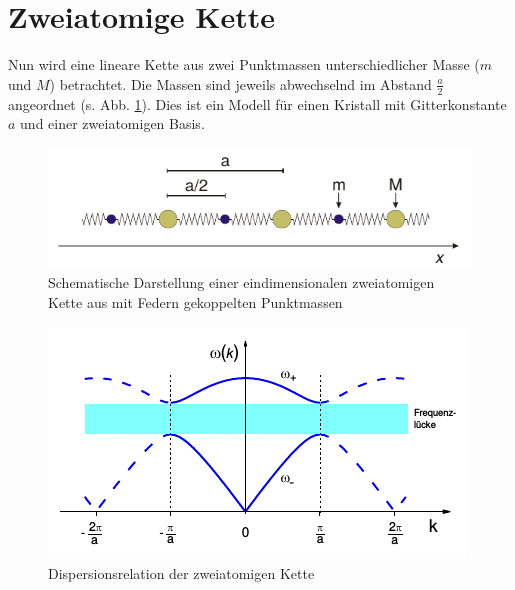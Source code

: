 \section{Zweiatomige Kette}

Nun wird eine lineare Kette aus zwei Punktmassen unterschiedlicher Masse ($m$ und $M$) betrachtet. Die Massen sind jeweils abwechselnd im Abstand $\frac{a}{2}$ angeordnet (s. Abb. \ref{fig:2d_kette}). Dies ist ein Modell für einen Kristall mit Gitterkonstante $a$ und einer zweiatomigen Basis.

\begin{figure}[tb]
  \centering
  \includegraphics[scale=1.0]{./fig/2d_kette.png}
  \caption{Schematische Darstellung einer eindimensionalen zweiatomigen Kette aus mit Federn gekoppelten Punktmassen \cite{Litmap}}
  \label{fig:2d_kette}
\end{figure}

\begin{figure}[tb]
  \centering
  \includegraphics[scale=1.0]{./fig/brillouin_2.png}
  \caption{Dispersionsrelation der zweiatomigen Kette \cite{Litmap}}
  \label{fig:brillouin_2}
\end{figure}

